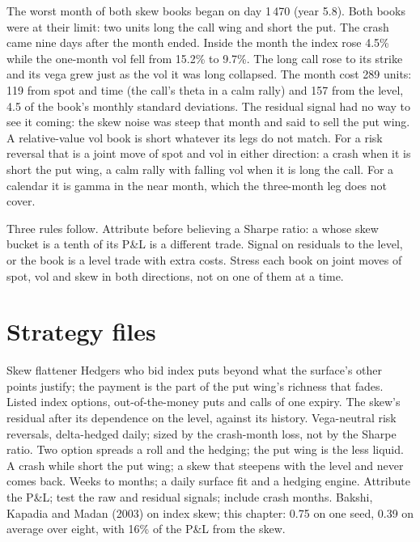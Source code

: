 The worst month of both skew books began on day 1\,470 (year 5.8). Both books were at their limit: two units long the call wing and short the put. The
crash came nine days after the month ended. Inside the month the index rose 4.5\% while the one-month vol fell from 15.2\% to 9.7\%. The long call
rose to its strike and its vega grew just as the vol it was long collapsed. The month cost 289 units: 119 from spot and time (the call's theta in a
calm rally) and 157 from the level, 4.5 of the book's monthly standard deviations. The residual signal had no way to see it coming: the skew noise was
steep that month and said to sell the put wing. A relative-value vol book is short whatever its legs do not match. For a risk reversal that is a joint
move of spot and vol in either direction: a crash when it is short the put wing, a calm rally with falling vol when it is long the call. For a calendar
it is gamma in the near month, which the three-month leg does not cover.

Three rules follow. Attribute before believing a Sharpe ratio: a  whose skew bucket is a tenth of its P\&L is a different trade. Signal on
residuals to the level, or the book is a level trade with extra costs. Stress each book on joint moves of spot, vol and skew in both directions, not on
one of them at a time.

\section{Strategy files}

\begin{strategyfile}{Skew flattener}\label{strat:s2:skew-and-term-structure-relative-value:skew}
 Hedgers who bid index puts beyond what the surface's other points justify; the payment is the part of the put wing's
richness that fades.
 Listed index options, out-of-the-money puts and calls of one expiry.
 The skew's residual after its dependence on the level, against its history.
 Vega-neutral risk reversals, delta-hedged daily; sized by the crash-month loss, not by the Sharpe ratio.
 Two option spreads a roll and the hedging; the put wing is the less liquid.
 A crash while short the put wing; a skew that steepens with the level and never comes back.
 Weeks to months; a daily surface fit and a hedging engine.
 Attribute the P\&L; test the raw and residual signals; include crash months.
 Bakshi, Kapadia and Madan (2003) on index skew; this chapter: 0.75 on one seed, 0.39 on average over eight, with 16\% of the P\&L
from the skew.
\end{strategyfile}

